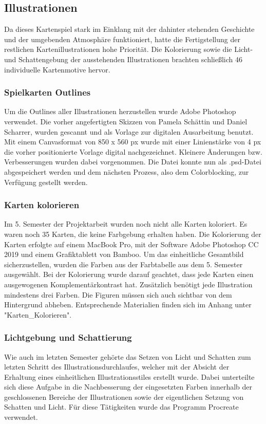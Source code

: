 \subsection{Illustrationen}
Da dieses Kartenspiel stark im Einklang mit der dahinter stehenden Geschichte und der umgebenden Atmosphäre funktioniert, hatte die Fertigstellung der restlichen Kartenillustrationen hohe Priorität. Die Kolorierung sowie die Licht- und Schattengebung der ausstehenden Illustrationen brachten schließlich 46 individuelle Kartenmotive hervor.

\subsubsection{Spielkarten Outlines}
Um die Outlines aller Illustrationen herzustellen wurde Adobe Photoshop verwendet. Die vorher angefertigten Skizzen von Pamela Schättin und Daniel Scharrer, wurden gescannt und als Vorlage zur digitalen Ausarbeitung benutzt. Mit einem Canvasformat von 850 x 560 px wurde mit einer Linienstärke von 4 px die vorher positionierte Vorlage digital nachgezeichnet. Kleinere Änderungen bzw. Verbesserungen wurden dabei vorgenommen. Die Datei konnte nun als .psd-Datei abgespeichert werden und dem nächsten Prozess, also dem Colorblocking, zur Verfügung gestellt werden.

\subsubsection{Karten kolorieren}
Im 5. Semester der Projektarbeit wurden noch nicht alle Karten koloriert. Es waren noch 35 Karten, die keine Farbgebung erhalten haben. Die Kolorierung der Karten erfolgte auf einem MacBook Pro, mit der Software Adobe Photoshop CC 2019 und einem Grafiktablett von Bamboo. Um das einheitliche Gesamtbild sicherzustellen, wurden die Farben aus der Farbtabelle aus dem 5. Semester ausgewählt. Bei der Kolorierung wurde darauf geachtet, dass jede Karten einen ausgewogenen Komplementärkontrast hat. Zusätzlich benötigt jede Illustration mindestens drei Farben. Die Figuren müssen sich auch sichtbar von dem Hintergrund abheben. 
Entsprechende Materialien finden sich im Anhang unter "Karten\_Kolorieren".

\subsubsection{Lichtgebung und Schattierung}
Wie auch im letzten Semester gehörte das Setzen von Licht und Schatten zum letzten Schritt des Illustrationsdurchlaufes, welcher mit der Absicht der Erhaltung eines einheitlichen Illustrationsstiles erstellt wurde. Dabei unterteilte sich diese Aufgabe in die Nachbesserung der eingesetzten Farben innerhalb der geschlossenen Bereiche der Illustrationen sowie der eigentlichen Setzung von Schatten und Licht. Für diese Tätigkeiten wurde das Programm Procreate verwendet.

